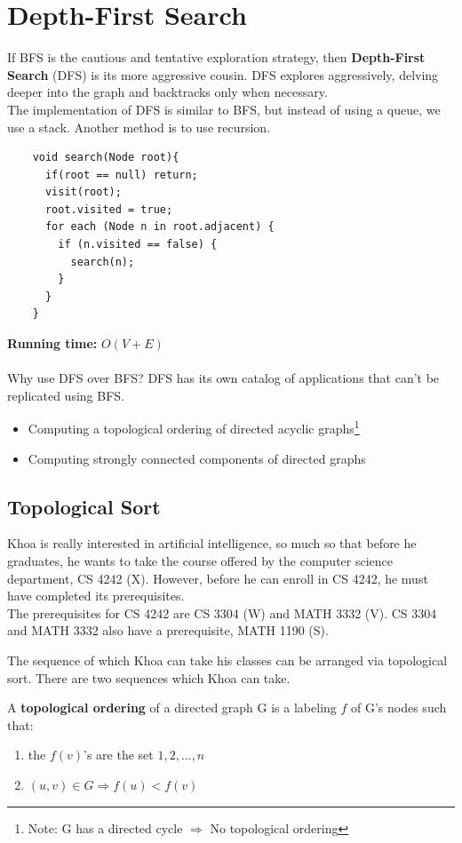 \documentclass[]{book}
\newcommand{\runtime}{\textbf{Running time:}}
\begin{document}
  \section{Depth-First Search}
  If BFS is the cautious and tentative exploration strategy, then \textbf{Depth-First Search}
  (DFS) is its more aggressive cousin. DFS explores aggressively, delving deeper
  into the graph and backtracks only when necessary.\\
  \indent The implementation of DFS is similar to BFS, but instead of using a queue, we
  use a stack. Another method is to use recursion.\\
  \begin{Verbatim}
    void search(Node root){
      if(root == null) return;
      visit(root);
      root.visited = true;
      for each (Node n in root.adjacent) {
        if (n.visited == false) {
          search(n);
        }
      }
    }
  \end{Verbatim}
  \runtime{} $O(V+E)$\\\\
  Why use DFS over BFS? DFS has its own catalog of applications that can't be replicated
  using BFS.
  \begin{itemize}
    \item Computing a topological ordering of directed acyclic graphs\footnote{
    Note: G has a directed cycle $\Longrightarrow$ No topological ordering
    }
    \item Computing strongly connected components of directed graphs
  \end{itemize}

  \subsection*{Topological Sort}
  Khoa is really interested in artificial intelligence, so much so that before he graduates,
  he wants to take the course offered by the computer science department, CS 4242 (X).
  However, before he can enroll in CS 4242, he must have completed its prerequisites.\\
  \indent The prerequisites for CS 4242 are CS 3304 (W) and MATH 3332 (V). CS 3304 and MATH 3332
  also have a prerequisite, MATH 1190 (S).

  The sequence of which Khoa can take his classes can be arranged via topological sort.
  There are two sequences which Khoa can take.

  A \textbf{topological ordering} of a directed graph G
  is a labeling $f$ of G's nodes such that:
  \begin{enumerate}
    \item the $f(v)$'s are the set ${1,2,\ldots, n}$
    \item $(u,v) \in G \Rightarrow f(u) < f(v)$
  \end{enumerate}
\end{document}
